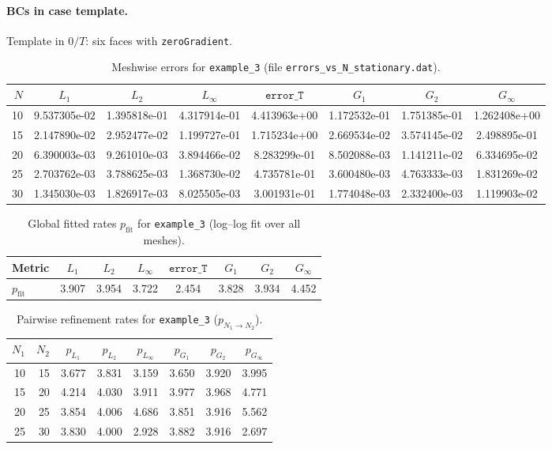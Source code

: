 \documentclass[11pt,a4paper]{article}
\begin{document}
\paragraph{BCs in case template.}
Template in $0/T$: six faces with \texttt{zeroGradient}.
\begin{table}[htbp]
\centering
\caption{Meshwise errors for \texttt{example\_3} (file \texttt{errors\_vs\_N\_stationary.dat}).}
\label{tab:errors-example-3}
\scriptsize
\begin{tabular}{rccccccc}
\toprule
$N$ & $L_1$ & $L_2$ & $L_\infty$ & $\texttt{error\_T}$ & $G_1$ & $G_2$ & $G_\infty$ \\
\midrule
10 & 9.537305e-02 & 1.395818e-01 & 4.317914e-01 & 4.413963e+00 & 1.172532e-01 & 1.751385e-01 & 1.262408e+00 \\
15 & 2.147890e-02 & 2.952477e-02 & 1.199727e-01 & 1.715234e+00 & 2.669534e-02 & 3.574145e-02 & 2.498895e-01 \\
20 & 6.390003e-03 & 9.261010e-03 & 3.894466e-02 & 8.283299e-01 & 8.502088e-03 & 1.141211e-02 & 6.334695e-02 \\
25 & 2.703762e-03 & 3.788625e-03 & 1.368730e-02 & 4.735781e-01 & 3.600480e-03 & 4.763333e-03 & 1.831269e-02 \\
30 & 1.345030e-03 & 1.826917e-03 & 8.025505e-03 & 3.001931e-01 & 1.774048e-03 & 2.332400e-03 & 1.119903e-02 \\
\bottomrule
\end{tabular}
\end{table}
\begin{table}[htbp]
\centering
\caption{Global fitted rates $p_{\mathrm{fit}}$ for \texttt{example\_3} (log--log fit over all meshes).}
\label{tab:fit-example-3}
\small
\begin{tabular}{lccccccc}
\toprule
Metric & $L_1$ & $L_2$ & $L_\infty$ & $\texttt{error\_T}$ & $G_1$ & $G_2$ & $G_\infty$ \\
\midrule
$p_{\mathrm{fit}}$ & 3.907 & 3.954 & 3.722 & 2.454 & 3.828 & 3.934 & 4.452 \\
\bottomrule
\end{tabular}
\end{table}
\begin{table}[htbp]
\centering
\caption{Pairwise refinement rates for \texttt{example\_3} ($p_{N_1\to N_2}$).}
\label{tab:pair-example-3}
\scriptsize
\begin{tabular}{rrcccccc}
\toprule
$N_1$ & $N_2$ & $p_{L_1}$ & $p_{L_2}$ & $p_{L_\infty}$ & $p_{G_1}$ & $p_{G_2}$ & $p_{G_\infty}$ \\
\midrule
10 & 15 & 3.677 & 3.831 & 3.159 & 3.650 & 3.920 & 3.995 \\
15 & 20 & 4.214 & 4.030 & 3.911 & 3.977 & 3.968 & 4.771 \\
20 & 25 & 3.854 & 4.006 & 4.686 & 3.851 & 3.916 & 5.562 \\
25 & 30 & 3.830 & 4.000 & 2.928 & 3.882 & 3.916 & 2.697 \\
\bottomrule
\end{tabular}
\end{table}
\end{document}
